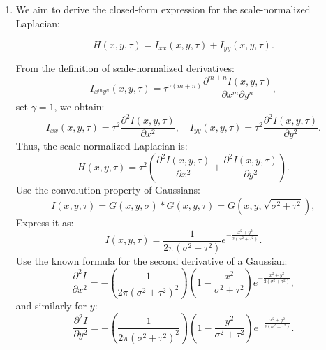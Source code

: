 \documentclass[12pt]{article}
\begin{document}
\subsection{}
\begin{enumerate}[label=\roman*., leftmargin=1cm]
    \item
We aim to derive the closed-form expression for the scale-normalized Laplacian:

\begin{equation}
    H(x,y,\tau) = I_{xx}(x,y,\tau) + I_{yy}(x,y,\tau).
\end{equation}

From the definition of scale-normalized derivatives:
\begin{equation}
    I_{x^m y^n}(x, y, \tau) = \tau^{\gamma(m+n)} \frac{\partial^{m+n} I(x,y,\tau)}{\partial x^m \partial y^n},
\end{equation}
set \( \gamma = 1 \), we obtain:
\begin{equation}
    I_{xx}(x,y,\tau) = \tau^2 \frac{\partial^2 I(x,y,\tau)}{\partial x^2}, \quad
    I_{yy}(x,y,\tau) = \tau^2 \frac{\partial^2 I(x,y,\tau)}{\partial y^2}.
\end{equation}
Thus, the scale-normalized Laplacian is:
\begin{equation}
    H(x,y,\tau) = \tau^2 \left( \frac{\partial^2 I(x,y,\tau)}{\partial x^2} + \frac{\partial^2 I(x,y,\tau)}{\partial y^2} \right).
\end{equation}
Use the convolution property of Gaussians:
\begin{equation}
    I(x,y,\tau) = G(x,y,\sigma) * G(x,y,\tau) = G(x,y,\sqrt{\sigma^2 + \tau^2}),
\end{equation}
Express it as:
\begin{equation}
    I(x,y,\tau) = \frac{1}{2\pi(\sigma^2 + \tau^2)} e^{-\frac{x^2 + y^2}{2(\sigma^2 + \tau^2)}}.
\end{equation}
Use the known formula for the second derivative of a Gaussian:
\begin{equation}
    \frac{\partial^2 I}{\partial x^2} = - \left(\frac{1}{2\pi (\sigma^2 + \tau^2)^2}\right) \left(1 - \frac{x^2}{\sigma^2 + \tau^2} \right) e^{-\frac{x^2 + y^2}{2(\sigma^2 + \tau^2)}},
\end{equation}
and similarly for \( y \):
\begin{equation}
    \frac{\partial^2 I}{\partial y^2} = - \left(\frac{1}{2\pi (\sigma^2 + \tau^2)^2}\right) \left(1 - \frac{y^2}{\sigma^2 + \tau^2} \right) e^{-\frac{x^2 + y^2}{2(\sigma^2 + \tau^2)}}.
\end{equation}

\end{enumerate}
\end{document}
